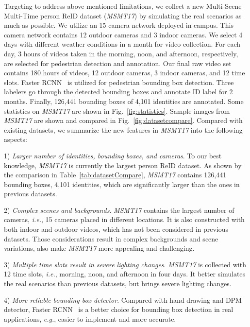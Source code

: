 \documentclass[10pt,twocolumn,letterpaper]{article}
\begin{document}
Targeting to address above mentioned limitations, we collect a new Multi-Scene Multi-Time person ReID dataset (\emph{MSMT17}) by simulating the real scenarios as much as possible. We utilize an 15-camera network deployed in campus. This camera network contains 12 outdoor cameras and 3 indoor cameras. We select 4 days with different weather conditions in a month for video collection. For each day, 3 hours of videos taken in the morning, noon, and afternoon, respectively, are selected for pedestrian detection and annotation. Our final raw video set contains 180 hours of videos, 12 outdoor cameras, 3 indoor cameras, and 12 time slots. Faster RCNN~\cite{ren2015faster} is utilized for pedestrian bounding box detection. Three labelers go through the detected bounding boxes and annotate ID label for 2 months. Finally, 126,441 bounding boxes of 4,101 identities are annotated. Some statistics on \emph{MSMT17} are shown in Fig.~\ref{fig:statistics}. Sample images from \emph{MSMT17} are shown and compared in Fig.~\ref{fig:datasetcompare}. Compared with existing datasets, we summarize the new features in \emph{MSMT17} into the following aspects:

1) \emph{Larger number of identities, bounding boxes, and cameras}. To our best knowledge, \emph{MSMT17} is currently the largest person ReID dataset. As shown by the comparison in Table~\ref{tab:datasetCompare}, \emph{MSMT17} contains 126,441 bounding boxes, 4,101 identities, which are significantly larger than the ones in previous datasets.

2) \emph{Complex scenes and backgrounds}. \emph{MSMT17} contains the largest number of cameras, \emph{i.e.}, 15 cameras placed in different locations. It is also constructed with both indoor and outdoor videos, which has not been considered in previous datasets. Those considerations result in complex backgrounds and scene variations, also make \emph{MSMT17} more appealing and challenging.

3) \emph{Multiple time slots result in severe lighting changes}. \emph{MSMT17} is collected with 12 time slots, \emph{i.e.}, morning, noon, and afternoon in four days. It better simulates the real scenarios than previous datasets, but brings severe lighting changes.

4) \emph{More reliable bounding box detector}. Compared with hand drawing and DPM detector, Faster RCNN~\cite{ren2015faster} is a better choice for bounding box detection in real applications, \emph{e.g.}, easier to implement and more accurate.
\end{document}
